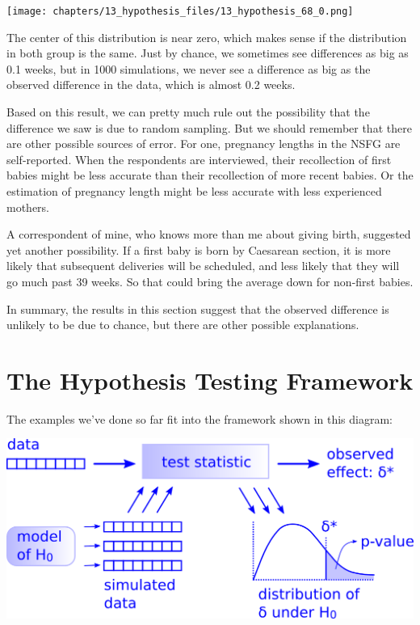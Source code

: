\begin{center}
\texttt{[image: chapters/13\_hypothesis\_files/13\_hypothesis\_68\_0.png]}
\end{center}

The center of this distribution is near zero, which makes sense if the
distribution in both group is the same. Just by chance, we sometimes see
differences as big as 0.1 weeks, but in 1000 simulations, we never see a
difference as big as the observed difference in the data, which is
almost 0.2 weeks.

Based on this result, we can pretty much rule out the possibility that
the difference we saw is due to random sampling. But we should remember
that there are other possible sources of error. For one, pregnancy
lengths in the NSFG are self-reported. When the respondents are
interviewed, their recollection of first babies might be less accurate
than their recollection of more recent babies. Or the estimation of
pregnancy length might be less accurate with less experienced mothers.

A correspondent of mine, who knows more than me about giving birth,
suggested yet another possibility. If a first baby is born by Caesarean
section, it is more likely that subsequent deliveries will be scheduled,
and less likely that they will go much past 39 weeks. So that could
bring the average down for non-first babies.

In summary, the results in this section suggest that the observed
difference is unlikely to be due to chance, but there are other possible
explanations.

\hypertarget{the-hypothesis-testing-framework}{%
\section{The Hypothesis Testing
Framework}\label{the-hypothesis-testing-framework}}

The examples we've done so far fit into the framework shown in this
diagram:

\includegraphics{chapters/figs/hypothesis_testing.png}

